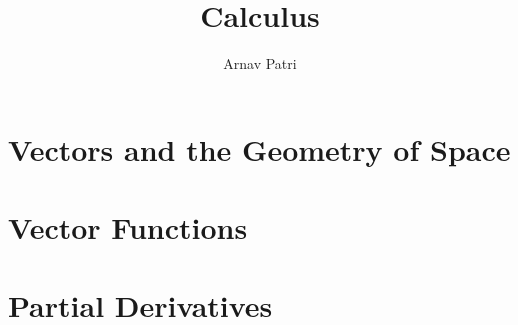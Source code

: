 \documentclass[12pt, A4]{report}
\title{Calculus \Roman{3}}
\author{Arnav Patri}
\begin{document}
	\maketitle
	\tableofcontents
	\setcounter{chapter}{11}
		\chapter{Vectors and the Geometry of Space}
			
		\chapter{Vector Functions}
			
		\chapter{Partial Derivatives}
			
\end{document}
